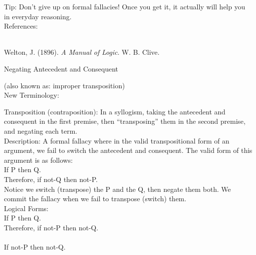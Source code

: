 \documentclass[a4paper,12pt,single,pdftex]{scrartcl}
\begin{document}
    
      Tip: Don’t give up on formal fallacies!  Once you get it, it actually will help you in everyday reasoning.
    \\

    References:

    
      
        
      \\

      
        
          Welton, J. (1896). {\it A Manual of Logic}. W. B. Clive.
        
      
    
  

Negating Antecedent and Consequent
    
      (also known as: improper transposition)
    \\

  
    New Terminology:

    
      Transposition (contraposition): In a syllogism, taking the antecedent and consequent in the first premise, then “transposing” them in the second premise, and negating each term.
    \\

    
      Description: A formal fallacy where in the valid transpositional form of an argument, we fail to switch the antecedent and consequent.  The valid form of this argument is as follows:
    \\

    
      If P then Q.
    \\

    
      Therefore, if not-Q then not-P.
    \\

    
      Notice we switch (transpose) the P and the Q, then negate them both.  We commit the fallacy when we fail to transpose (switch) them.
    \\

    
      Logical Forms:
    \\

    
      If P then Q.
    \\

    
      Therefore, if not-P then not-Q.
    \\

    
       
    \\

    
      If not-P then not-Q.
    \\
\end{document}
